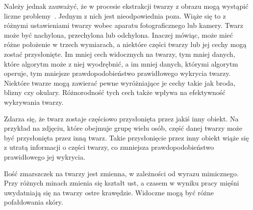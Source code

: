 \documentclass[a4paper,twoside,12pt]{book}
\begin{document}
    Należy jednak zauważyć, że w procesie ekstrakcji twarzy z obrazu mogą wystąpić liczne problemy~\cite{mehdiRizvi}.
    Jednym z nich jest nieodpowiednia poza.
    Wiąże się to z różnymi ustawieniami twarzy wobec aparatu fotograficznego lub kamery.
    Twarz może być nachylona, przechylona lub odchylona.
    Inaczej mówiąc, może mieć różne położenie w trzech wymiarach, a
    niektóre części twarzy lub jej cechy mogą zostać przysłonięte.
    Im mniej cech widocznych na twarzy, tym mniej danych, które algorytm może z niej wyodrębnić, a
    im mniej danych, którymi algorytm operuje, tym mniejsze prawdopodobieństwo prawidłowego wykrycia twarzy.
    Niektóre twarze mogą zawierać pewne wyróżniające je cechy takie jak broda, blizny czy okulary.
    Różnorodność tych cech także wpływa na efektywność wykrywania twarzy.

    Zdarza się, że twarz zostaje częściowo przysłonięta przez jakiś inny obiekt.
    Na przykład na zdjęciu,
    które obejmuje grupę wielu osób, część danej twarzy może być przysłonięta przez inną twarz.
    Takie przysłonięcie przez inny obiekt wiąże się z utratą informacji o części twarzy, co zmniejsza prawdopodobieństwo
    prawidłowego jej wykrycia.

    Ilość zmarszczek na twarzy jest zmienna, w zależności od wyrazu mimicznego.
    Przy różnych minach zmienia się kształt ust, a czasem w wyniku pracy mięśni uwydatniają się na twarzy ostre
    krawędzie.
    Widoczne mogą być różne pofałdowania skóry.
\end{document}
